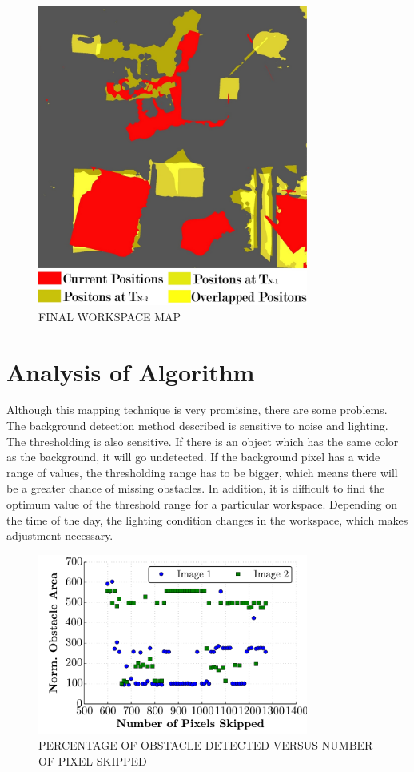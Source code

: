 \documentclass[twocolumn,10pt]{asme2e}
\begin{document}
\begin{figure}[t]
\begin{center}
\includegraphics[width=3.5in]{overlapped}
\caption{FINAL WORKSPACE MAP}
\label{default}
\end{center}
\end{figure}

\section*{Analysis of Algorithm}
Although this mapping technique is very promising, there are some problems. The background detection method described is sensitive to noise and lighting. The thresholding is also sensitive. If there is an object which has the same color as the background, it will go undetected. If the background pixel has a wide range of values, the thresholding range has to be bigger, which means there will be a greater chance of missing obstacles. In addition, it is difficult to find the optimum value of the threshold range for a particular workspace. Depending on the time of the day, the lighting condition changes in the workspace, which makes adjustment necessary. 

\begin{figure}[t]
\begin{center}
\includegraphics[width=3.5in]{SkippedPixels_v_ObstacleArea}
\caption{PERCENTAGE OF OBSTACLE DETECTED VERSUS NUMBER OF PIXEL SKIPPED}
\label{default}
\end{center}
\end{figure}
\end{document}
